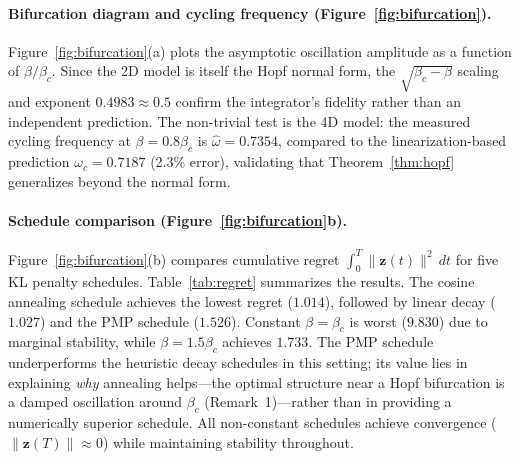 \documentclass[10pt]{article}
\newcommand{\bz}{\bm{z}}
\begin{document}
\paragraph{Bifurcation diagram and cycling frequency (Figure~\ref{fig:bifurcation}).}
Figure~\ref{fig:bifurcation}(a) plots the asymptotic oscillation amplitude as a function of $\beta/\beta_c$.
Since the 2D model is itself the Hopf normal form, the $\sqrt{\beta_c - \beta}$ scaling and exponent $0.4983 \approx 0.5$ confirm the integrator's fidelity rather than an independent prediction.
The non-trivial test is the 4D model: the measured cycling frequency at $\beta = 0.8\beta_c$ is $\hat{\omega} = 0.7354$, compared to the linearization-based prediction $\omega_c = 0.7187$ (2.3\% error), validating that Theorem~\ref{thm:hopf} generalizes beyond the normal form.

\paragraph{Schedule comparison (Figure~\ref{fig:bifurcation}b).}
Figure~\ref{fig:bifurcation}(b) compares cumulative regret $\int_0^T \|\bz(t)\|^2\,dt$ for five KL penalty schedules.
Table~\ref{tab:regret} summarizes the results.
The cosine annealing schedule achieves the lowest regret ($1.014$), followed by linear decay ($1.027$) and the PMP schedule ($1.526$).
Constant $\beta = \beta_c$ is worst ($9.830$) due to marginal stability, while $\beta = 1.5\beta_c$ achieves $1.733$.
The PMP schedule underperforms the heuristic decay schedules in this setting; its value lies in explaining \emph{why} annealing helps---the optimal structure near a Hopf bifurcation is a damped oscillation around $\beta_c$ (Remark~1)---rather than in providing a numerically superior schedule.
All non-constant schedules achieve convergence ($\|\bz(T)\| \approx 0$) while maintaining stability throughout.
\end{document}
